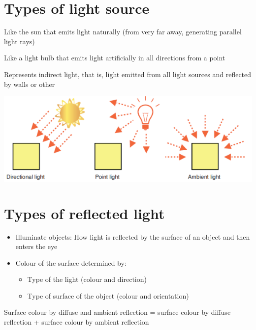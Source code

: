 \documentclass{article}[18pt]
\begin{document}
\section{Types of light source}
\begin{definition}
	Like the sun that emits light naturally (from very far away, generating parallel light rays)
\end{definition}
\begin{definition}
	Like a light bulb that emits light artificially in all directions from a point
\end{definition}
\begin{definition}
	Represents indirect light, that is, light emitted from all light sources and reflected by walls or other
\end{definition}
\begin{center}
	\includegraphics[scale=0.7]{"Types of Light"}
\end{center}
\section{Types of reflected light}
\begin{itemize}
	\item Illuminate objects: How light is reflected by the surface of an object and then enters the eye
	\item Colour of the surface determined by:
	\begin{itemize}
		\item Type of the light (colour and direction)
		\item Type of surface of the object (colour and orientation)
	\end{itemize}
\end{itemize}
Surface colour by diffuse and ambient reflection = surface colour by diffuse reflection + surface colour by ambient reflection
\end{document}
